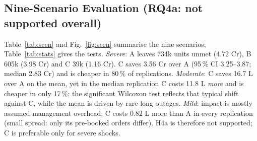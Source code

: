 \documentclass[conference]{IEEEtran}
\newcommand{\SevA}{4.72}
\newcommand{\SevB}{3.98}
\newcommand{\SevC}{1.16}
\newcommand{\SaveAC}{3.56}
\newcommand{\SaveACl}{3.25}
\newcommand{\SaveACh}{3.87}
\newcommand{\SevUnmetA}{734}
\newcommand{\SevUnmetB}{605}
\newcommand{\SevUnmetC}{39}
\newcommand{\MildExtraC}{0.82}
\newcommand{\ModSaveAC}{16.7}
\newcommand{\ModACmed}{11.8}
\newcommand{\ModACwin}{17}
\newcommand{\SevACmed}{2.83}
\newcommand{\SevACwin}{80}
\begin{document}
\subsection{Nine-Scenario Evaluation (RQ4a: not supported overall)}\label{sec:scen}
Table~\ref{tab:scen} and Fig.~\ref{fig:scen} summarise the nine scenarios; Table~\ref{tab:stats} gives the tests. \emph{Severe}: A leaves \SevUnmetA{}k units unmet (\SevA{} Cr), B \SevUnmetB{}k (\SevB{} Cr) and C \SevUnmetC{}k (\SevC{} Cr). C saves
\SaveAC{} Cr over A (95\,\% CI \SaveACl--\SaveACh; median \SevACmed{} Cr) and is cheaper in \SevACwin\,\% of replications.
\emph{Moderate}: C saves \ModSaveAC{} L over A on the mean, yet in the median replication C costs \ModACmed{} L \emph{more} and is cheaper in
only \ModACwin\,\%; the significant Wilcoxon test reflects that typical shift against C, while the mean is driven by rare long outages.
\emph{Mild}: impact is mostly assumed management overhead; C costs \MildExtraC{} L more than A in every replication (small spread: only its
pre-booked orders differ). H4a is therefore not supported; C is preferable only for severe shocks.
\end{document}
